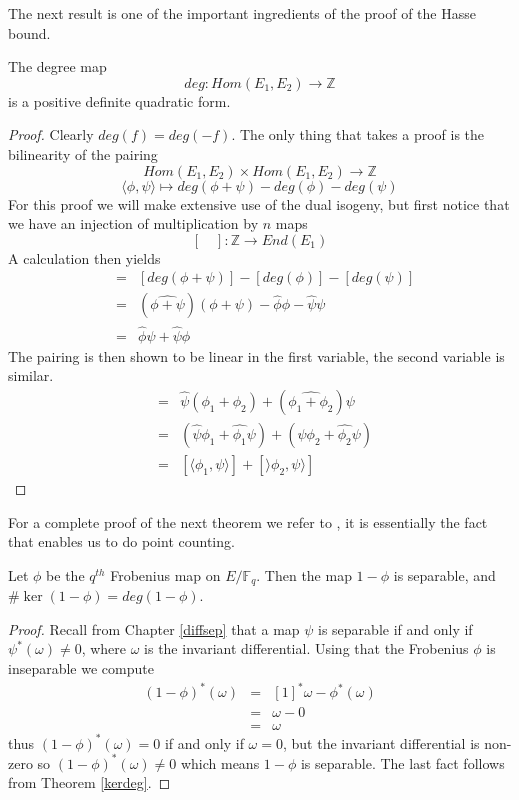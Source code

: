 The next result is one of the important ingredients of the proof of the Hasse bound.
\begin{prop}
 The degree map
$$ deg: Hom(E_1, E_2) \rightarrow \mathbb{Z} $$
is a positive definite quadratic form.
\end{prop}
\begin{proof}
 Clearly $deg(f) = deg(-f)$. The only thing that takes a proof is the
bilinearity of the pairing
$$ Hom(E_1, E_2) \times Hom(E_1, E_2) \rightarrow \mathbb{Z}$$
$$ \langle \phi, \psi \rangle \mapsto deg(\phi + \psi) - deg(\phi) - deg(\psi) $$
For this proof we will make extensive use of the dual isogeny, but first
notice that we have an injection of multiplication by $n$ maps
$$ [\quad]: \mathbb{Z} \rightarrow End(E_1) $$
A calculation then yields 
\begin{eqnarray*} 
 [\langle \phi,\psi \rangle] &=& [deg(\phi+\psi)]-[deg(\phi)]-[deg(\psi)] \nonumber \\
               &=& (\widehat{\phi+\psi})(\phi+\psi) - \widehat{\phi}\phi - \widehat{\psi}\psi \nonumber \\
	       &=& \widehat{\phi}\psi + \widehat{\psi}\phi
\end{eqnarray*}
The pairing is then shown to be linear in the first variable, the second variable is
similar.
\begin{eqnarray*}
 [\langle \phi_1+\phi_2, \psi \rangle] &=& \widehat{\psi}(\phi_1+\phi_2) + (\widehat{\phi_1+\phi_2})\psi \nonumber \\
			 &=& (\widehat{\psi}\phi_1+\widehat{\phi_1}\psi) + (\widehat{\psi}\phi_2 + \widehat{\phi_2}\psi) \nonumber \\
			 &=& [\langle \phi_1,\psi \rangle] + [\rangle \phi_2,\psi \rangle] 
\end{eqnarray*}
\end{proof}

For a complete proof of the next theorem we refer to \cite{AEC}, it is essentially the fact that enables
us to do point counting.

\begin{thm} \label{frobkernel}
 Let $\phi$ be the $q^{th}$ Frobenius map on $E/\mathbb{F}_q$. Then the map $1-\phi$ is separable, and
$\#\ker(1-\phi) = deg(1-\phi)$.
\end{thm}
\begin{proof}
  Recall from Chapter \ref{diffsep} that a map $\psi$ is separable if and only if $\psi^*(\omega) \neq 0$,
where $\omega$ is the invariant differential. Using that the Frobenius $\phi$ is inseparable \cite{AEC}
we compute
\begin{eqnarray}
 (1-\phi)^*(\omega) &=& [1]^*\omega - \phi^*(\omega) \nonumber \\
		    &=& \omega - 0 \nonumber \\
		    &=& \omega \nonumber
\end{eqnarray}
thus $(1-\phi)^*(\omega) = 0$ if and only if $\omega = 0$, but the invariant differential is non-zero
so $(1-\phi)^*(\omega) \neq 0$ which means $1-\phi$ is separable. The last fact follows
from Theorem \ref{kerdeg}.
\end{proof}

